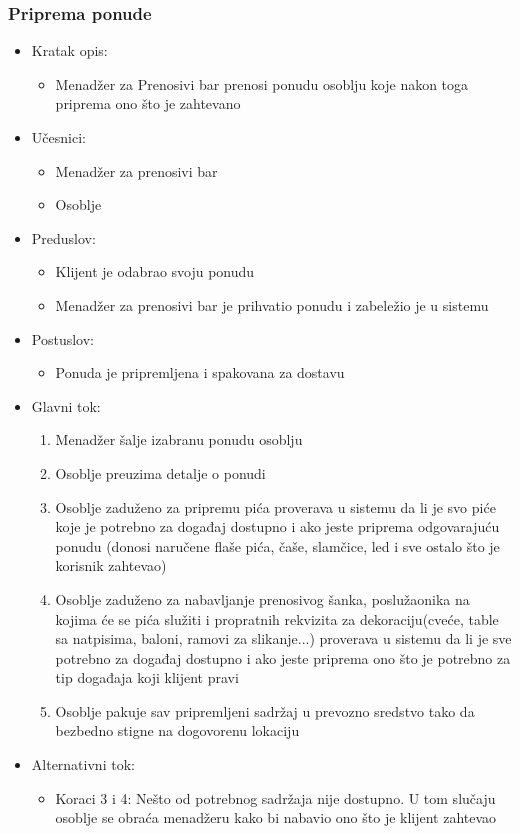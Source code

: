\documentclass[a4paper]{article}
\begin{document}
\subsubsection{Priprema ponude}

\begin{itemize}
    \item Kratak opis:
        \begin{itemize}
            \item Menadžer za Prenosivi bar prenosi ponudu osoblju koje nakon toga priprema ono što je zahtevano
        \end{itemize}
    \item Učesnici:
        \begin{itemize}
            \item Menadžer za prenosivi bar
            \item Osoblje
        \end{itemize}
    \item Preduslov:
        \begin{itemize}
            \item Klijent je odabrao svoju ponudu
		    \item Menadžer za prenosivi bar je prihvatio ponudu i zabeležio je u sistemu
        \end{itemize}
    \item Postuslov:
        \begin{itemize}
            \item Ponuda je pripremljena i spakovana za dostavu
        \end{itemize}
    \item Glavni tok:
        \begin{enumerate}
           \item Menadžer šalje izabranu ponudu osoblju
		   \item Osoblje preuzima detalje o ponudi
	       \item Osoblje zaduženo za pripremu pića proverava u sistemu da li je svo piće koje je potrebno za događaj dostupno i ako jeste priprema odgovarajuću ponudu (donosi naručene flaše pića, čaše, slamčice, led i sve ostalo što je korisnik zahtevao)
	       \item Osoblje  zaduženo za nabavljanje prenosivog šanka, poslužaonika na kojima će se pića služiti i propratnih rekvizita za dekoraciju(cveće, table sa natpisima, baloni, ramovi za slikanje...) proverava u sistemu da li je sve potrebno za događaj dostupno i ako jeste priprema ono što je potrebno za tip događaja koji klijent pravi
	        \item Osoblje pakuje sav pripremljeni sadržaj u prevozno sredstvo tako da bezbedno stigne na dogovorenu lokaciju
        \end{enumerate}
    \item Alternativni tok:
        \begin{itemize}
            \item Koraci 3 i 4: Nešto od potrebnog sadržaja nije dostupno. U tom slučaju osoblje se obraća menadžeru kako bi nabavio ono što je klijent zahtevao
        \end{itemize}
\end{itemize}
\end{document}
